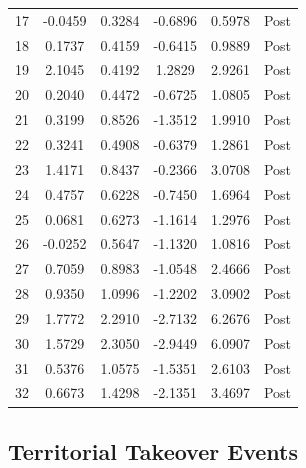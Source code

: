\documentclass[bibtex]{article}
\begin{document}
{\begin{longtable}{cccccc}
17 & -0.0459 & 0.3284 & -0.6896 & 0.5978 & Post \\
18 & 0.1737 & 0.4159 & -0.6415 & 0.9889 & Post \\
19 & 2.1045 & 0.4192 & 1.2829 & 2.9261 & Post \\
20 & 0.2040 & 0.4472 & -0.6725 & 1.0805 & Post \\
21 & 0.3199 & 0.8526 & -1.3512 & 1.9910 & Post \\
22 & 0.3241 & 0.4908 & -0.6379 & 1.2861 & Post \\
23 & 1.4171 & 0.8437 & -0.2366 & 3.0708 & Post \\
24 & 0.4757 & 0.6228 & -0.7450 & 1.6964 & Post \\
25 & 0.0681 & 0.6273 & -1.1614 & 1.2976 & Post \\
26 & -0.0252 & 0.5647 & -1.1320 & 1.0816 & Post \\
27 & 0.7059 & 0.8983 & -1.0548 & 2.4666 & Post \\
28 & 0.9350 & 1.0996 & -1.2202 & 3.0902 & Post \\
29 & 1.7772 & 2.2910 & -2.7132 & 6.2676 & Post \\
30 & 1.5729 & 2.3050 & -2.9449 & 6.0907 & Post \\
31 & 0.5376 & 1.0575 & -1.5351 & 2.6103 & Post \\
32 & 0.6673 & 1.4298 & -2.1351 & 3.4697 & Post \\
\end{longtable}


\subsection{Territorial Takeover Events}

}
\end{document}
